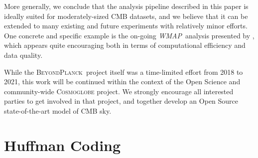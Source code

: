 \documentclass[twocolumn]{aa}
\def\WMAP{\emph{WMAP}}
\newcommand{\BP}{\textsc{BeyondPlanck}}
\begin{document}
More generally, we conclude that the analysis pipeline described in
this paper is ideally suited for moderately-sized CMB datasets, and we
believe that it can be extended to many existing and future
experiments with relatively minor efforts. One concrete and specific
example is the on-going \WMAP\ analysis presented by \citet{BP17},
which appears quite encouraging both in terms of computational
efficiency and data quality.

While the \BP\ project itself was a time-limited effort from 2018 to
2021, this work will be continued within the context of the Open
Science and community-wide \textsc{Cosmoglobe} project. We strongly
encourage all interested parties to get involved in that project, and
together develop an Open Source state-of-the-art model of CMB sky.

\appendix

\section{Huffman Coding}
\label{app:huff}
\end{document}
